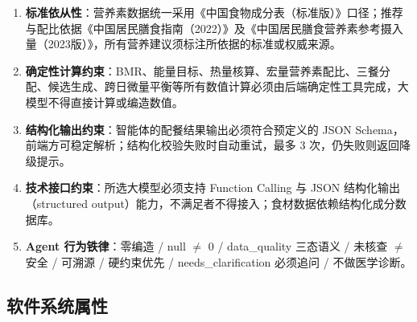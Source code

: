 \documentclass[12pt,a4paper]{ctexart}
\begin{document}
\begin{enumerate}
\item \textbf{标准依从性}：营养素数据统一采用《中国食物成分表（标准版）》口径；推荐与配比依据《中国居民膳食指南（2022）》及《中国居民膳食营养素参考摄入量（2023版）》，所有营养建议须标注所依据的标准或权威来源。
\item \textbf{确定性计算约束}：BMR、能量目标、热量核算、宏量营养素配比、三餐分配、候选生成、跨日微量平衡等所有数值计算必须由后端确定性工具完成，大模型不得直接计算或编造数值。
\item \textbf{结构化输出约束}：智能体的配餐结果输出必须符合预定义的 JSON Schema，前端方可稳定解析；结构化校验失败时自动重试，最多 3 次，仍失败则返回降级提示。
\item \textbf{技术接口约束}：所选大模型必须支持 Function Calling 与 JSON 结构化输出（structured output）能力，不满足者不得接入；食材数据依赖结构化成分数据库。
\item \textbf{Agent 行为铁律}：零编造 / null $\neq$ 0 / data\_quality 三态语义 / 未核查 $\neq$ 安全 / 可溯源 / 硬约束优先 / needs\_clarification 必须追问 / 不做医学诊断。
\end{enumerate}

\subsection{软件系统属性}\label{sec:attributes}
\end{document}
